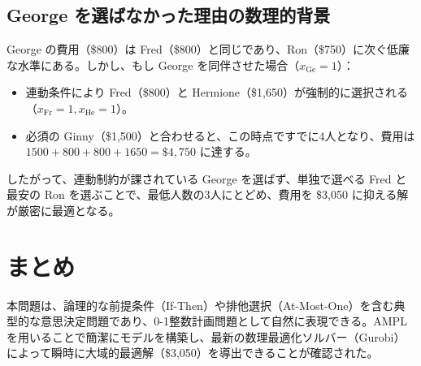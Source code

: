 \documentclass[11pt,a4paper]{ltjsarticle}
\begin{document}
\subsection{George を選ばなかった理由の数理的背景}
George の費用（\$800）は Fred（\$800）と同じであり、Ron（\$750）に次ぐ低廉な水準にある。しかし、もし George を同伴させた場合（$x_{\text{Ge}} = 1$）：
\begin{itemize}
  \item 連動条件により Fred（\$800）と Hermione（\$1,650）が強制的に選択される（$x_{\text{Fr}} = 1, x_{\text{He}} = 1$）。
  \item 必須の Ginny（\$1,500）と合わせると、この時点ですでに4人となり、費用は $1500 + 800 + 800 + 1650 = \$4,750$ に達する。
\end{itemize}
したがって、連動制約が課されている George を選ばず、単独で選べる Fred と最安の Ron を選ぶことで、最低人数の3人にとどめ、費用を \$3,050 に抑える解が厳密に最適となる。

\section{まとめ}
本問題は、論理的な前提条件（If-Then）や排他選択（At-Most-One）を含む典型的な意思決定問題であり、0-1整数計画問題として自然に表現できる。AMPL を用いることで簡潔にモデルを構築し、最新の数理最適化ソルバー（Gurobi）によって瞬時に大域的最適解（\$3,050）を導出できることが確認された。
\end{document}
